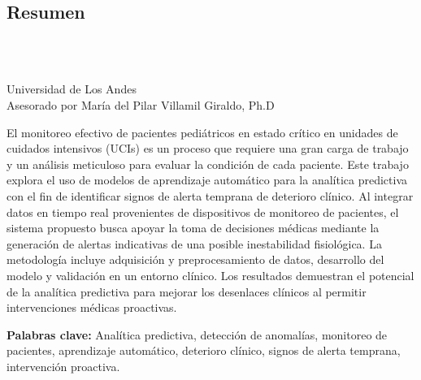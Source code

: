\begin{titlepage}
  \centering
  \newpage
  \pagestyle{empty}

  \chapter*{Resumen}
  \vspace{0.5cm}

  {\bf\centering \ThesisTitle} \\
  \vspace{0.8cm}

  \begin{flushright}
    \AuthorName \\
    Universidad de Los Andes \\
    Asesorado por María del Pilar Villamil Giraldo, Ph.D
  \end{flushright}

  \vspace{0.8cm}

  \justifying El monitoreo efectivo de pacientes pediátricos en estado crítico en unidades de cuidados intensivos (UCIs) es un proceso que requiere una gran carga de trabajo y un análisis meticuloso para evaluar la condición de cada paciente. Este trabajo explora el uso de modelos de aprendizaje automático para la analítica predictiva con el fin de identificar signos de alerta temprana de deterioro clínico. Al integrar datos en tiempo real provenientes de dispositivos de monitoreo de pacientes, el sistema propuesto busca apoyar la toma de decisiones médicas mediante la generación de alertas indicativas de una posible inestabilidad fisiológica. La metodología incluye adquisición y preprocesamiento de datos, desarrollo del modelo y validación en un entorno clínico. Los resultados demuestran el potencial de la analítica predictiva para mejorar los desenlaces clínicos al permitir intervenciones médicas proactivas.

  \begin{flushleft}
    \vspace{0.5cm}
    \textbf{Palabras clave:} Analítica predictiva, detección de anomalías, monitoreo de pacientes, aprendizaje automático, deterioro clínico, signos de alerta temprana, intervención proactiva.

  \end{flushleft}

\end{titlepage}
